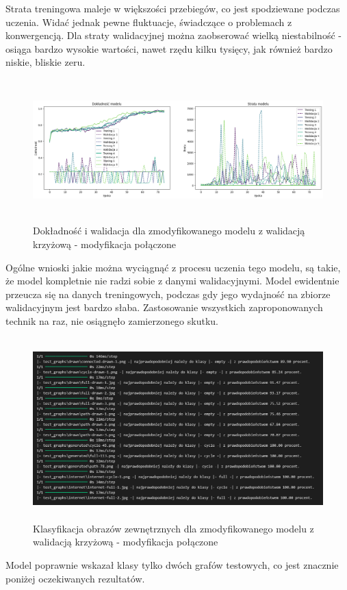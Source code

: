 Strata treningowa maleje w większości przebiegów, co jest spodziewane podczas uczenia.
Widać jednak pewne fluktuacje, świadczące o problemach z konwergencją.
Dla straty walidacyjnej można zaobserować wielką niestabilność - osiąga bardzo wysokie wartości,
nawet rzędu kilku tysięcy, jak również bardzo niskie, bliskie zeru.

\begin{figure}[ht]
	\centering
	\includegraphics[height=5.5cm]{resources/tests/images/v4/crossvalid_img.png}
	\caption{Dokładność i walidacja dla zmodyfikowanego modelu z walidacją krzyżową - modyfikacja połączone}
	\label{Fig:tests-cv-5a}
\end{figure}
\FloatBarrier

Ogólne wnioski jakie można wyciągnąć z procesu uczenia tego modelu,
są takie, że model kompletnie nie radzi sobie z danymi walidacyjnymi.
Model ewidentnie przeucza się na danych treningowych,
podczas gdy jego wydajność na zbiorze walidacyjnym jest bardzo słaba.
Zastosowanie wszystkich zaproponowanych technik na raz,
nie osiągnęło zamierzonego skutku. 

\begin{figure}[ht]
	\centering
	\includegraphics[height=7cm]{resources/tests/images/v4/crossvalid_txt.png}
	\caption{Klasyfikacja obrazów zewnętrznych dla zmodyfikowanego modelu z walidacją krzyżową - modyfikacja połączone}
	\label{Fig:tests-cv-5b}
\end{figure}
\FloatBarrier

Model poprawnie wskazał klasy tylko dwóch grafów testowych, co jest znacznie poniżej oczekiwanych rezultatów.